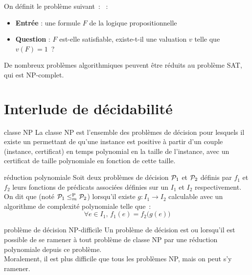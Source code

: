 On définit le problème suivant~:
~:
\begin{itemize}
    \item \textbf{Entrée} : une formule $F$ de la logique propositionnelle
    \item \textbf{Question} : $F$ est-elle satisfiable, \ie existe-t-il une valuation $v$ telle que $v(F) = 1$~?
\end{itemize}

\begin{remarque}{}{}
    De nombreux problèmes algorithmiques peuvent être réduits au problème SAT, qui est NP-complet.
\end{remarque}

\section{Interlude de décidabilité}

\begin{definition}{}{classe NP}
    La classe NP est l'ensemble des problèmes de décision pour lesquels il existe un  permettant de  qu'une instance est positive à partir d'un couple (instance, certificat) en temps polynomial en la taille de l'instance, avec un certificat de taille polynomiale en fonction de cette taille.
\end{definition}


\begin{definition}{}{réduction polynomiale}
    Soit deux problèmes de décision $\mathcal{P}_1$ et $\mathcal{P}_2$ définis par $f_1$ et $f_2$ leurs fonctions de prédicats associées définies sur un $I_1$ et $I_2$ respectivement. On dit que  (noté $\mathcal{P}_1 \leq_m^{\mathrm{P}} \mathcal{P}_2$) lorsqu'il existe $g:I_1 \to I_2$ calculable avec un algorithme de complexité polynomiale telle que~:
    $$\forall e \in I_1,\, f_1(e) = f_2\Big(g(e)\Big)$$
\end{definition}

\begin{definition}{}{problème de décision NP-difficile}
    Un problème de décision est  ou  lorsqu'il est possible de se ramener à tout problème de classe NP par une réduction polynomiale depuis ce problème.\\
    Moralement, il est plus difficile que tous les problèmes NP, mais on peut s'y ramener.
\end{definition}

